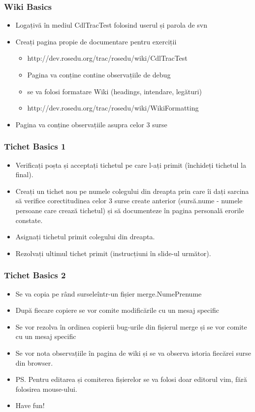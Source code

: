 \documentclass{beamer}
\begin{document}
  \frame{\tableofcontents[currentsection]}

  \begin{frame}
  \frametitle{Wiki Basics}

  \begin{itemize}
  \pause \item Logațivă în mediul CdlTracTest folosind userul și parola de svn
  \pause \item Creați pagina propie de documentare pentru exerciții
	\begin{itemize}
	\item http://dev.rosedu.org/trac/rosedu/wiki/CdlTracTest
	\item Pagina va conține contine observațiile de debug
	\item se va folosi formatare Wiki (headings, intendare, legături)
	\item http://dev.rosedu.org/trac/rosedu/wiki/WikiFormatting
	\end{itemize}
  \pause \item Pagina va conține observațiile asupra celor 3 surse
  \end{itemize}
  \end{frame}

  \begin{frame}
  \frametitle{Tichet Basics 1}

  \begin{itemize}
  \pause \item Verificați poșta și acceptați tichetul pe care l-ați primit
(închideți tichetul la final).
  \pause \item Creați un tichet nou pe numele colegului din dreapta prin care
îi dați sarcina să verifice corectitudinea celor 3 surse create anterior
(sursă.nume - numele persoane care crează tichetul) și să documenteze în
pagina personală erorile constate.
  \pause \item Asignați tichetul primit colegului din dreapta.
  \pause \item Rezolvați ultimul tichet primit (instrucțiuni în slide-ul următor).
  \end{itemize}
  \end{frame}

  \begin{frame}
  \frametitle{Tichet Basics 2}

  \begin{itemize}
  \pause \item Se va copia pe rând surseleîntr-un fișier merge.NumePrenume
  \pause \item După fiecare copiere se vor comite modificările cu un mesaj specific
  \pause \item Se vor rezolva în ordinea copierii bug-urile din fișierul merge și
se vor comite cu un mesaj specific
  \pause \item Se vor nota observațiile în pagina de wiki și se va observa istoria
fiecărei surse din browser.
  \pause \item PS. Pentru editarea și comiterea fișierelor se va folosi doar editorul vim,
fără folosirea mouse-ului.
  \item Have fun!
  \end{itemize}
  \end{frame}
\end{document}
